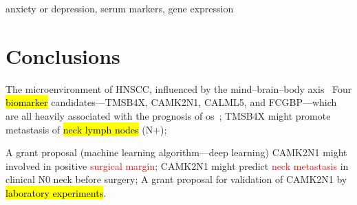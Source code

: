 \documentclass[
paper=landscape,
paper=160mm:90mm, %
fontsize=11pt, %
pagesize, %
parskip=half-, %
]{scrartcl} %
\theoremstyle{mythmstyle} %
\begin{document}
{\begin{outline}
\2 anxiety or depression, serum markers, gene expression

\end{outline}
\clearpage


\section*{Conclusions} %
\thispagestyle{headings}

\begin{outline}

\1 The microenvironment of HNSCC, influenced by the mind--brain--body axis~\autocite{Hsiao2012}
    \2 Four \hl{biomarker} candidates---TMSB4X, CAMK2N1, CALML5, and FCGBP---which are all heavily associated with the prognosis of \acrlong{os}~\autocite{Chi2017, Chi2021};
    \2 TMSB4X might promote metastasis of \hl{neck lymph nodes} (N+);

    

\1 A grant proposal (machine learning algorithm---deep learning)
    \2 CAMK2N1 might involved in positive \textcolor{red}{surgical margin};
    \2 CAMK2N1 might predict \textcolor{red}{neck metastasis} in clinical N0 neck before surgery;
\1 A grant proposal for validation of CAMK2N1 by \hl{laboratory experiments}.

\end{outline}

%
\clearpage

\thispagestyle{headings}

\begin{outline}



\end{outline}}
\end{document}
